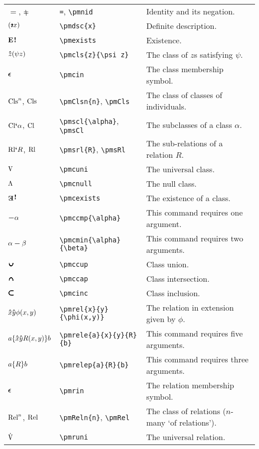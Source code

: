 \documentclass[12pt]{article}
\begin{document}
\noindent \begin{tabular}{@{}p{3cm} | p{5cm} | p{8.25cm}}
	$=$, $\pmnid$ & \verb|=|, \verb|\pmnid| & Identity and its negation. \\
	$\pmdsc{x}$ & \verb|\pmdsc{x}| & Definite description. \\
	$\textbf{E}\hspace{.1em}\textbf{!}$ & \verb|\pmexists| & Existence. \\
	$\mathbf{\hat{\text{$z$}}}(\psi z)$ & \verb|\pmcls{z}{\psi z}| & The class of $z$s satisfying $\psi$. \\
	$\mathop{\boldsymbol{\epsilon}}$ & \verb|\pmcin| & The class membership symbol. \\
	$\text{Cls}^{n}$, $\text{Cls}$ &  \verb|\pmClsn{n}|, \verb|\pmCls| & The class of classes of individuals. \\
	 $\text{Cl}\textbf{`}\alpha$, $\text{Cl}$ & \verb|\pmscl{\alpha}|, \verb|\pmsCl| & The subclasses of a class $\alpha$. \\
	 $\text{Rl}\textbf{`}R$, $\text{Rl}$ & \verb|\pmsrl{R}|, \verb|\pmsRl| & The sub-relations of a relation $R$. \\
	$\pmcuni$ & \verb|\pmcuni| & The universal class. \\
	$\Lambda$ & \verb|\pmcnull| & The null class. \\
	$\pmcexists$ & \verb|\pmcexists| & The existence of a class. \\
	$\boldsymbol{-}\alpha$ & \verb|\pmccmp{\alpha}| & This command requires one argument. \\
	$\alpha\boldsymbol{-}\beta$ & \verb|\pmcmin{\alpha}{\beta}| & This command requires two arguments. \\
	$\pmccup$ & \verb|\pmccup| & Class union. \\
	$\pmccap$ & \verb|\pmccap| & Class intersection. \\
	$\pmcinc$ & \verb|\pmcinc| & Class inclusion. \\
	$\mathbf{\hat{\text{$x$}}}\mathbf{\hat{\text{$y$}}}\phi(x,y)$ & \verb|\pmrel{x}{y}{\phi(x,y)}| & The relation in extension given by $\phi$. \\
	$a\{\mathbf{\hat{\text{$x$}}}\mathbf{\hat{\text{$y$}}}R(x, y)\}b$ & \verb|\pmrele{a}{x}{y}{R}{b}| & This command requires five arguments. \\
	$a\{R\}b$ & \verb|\pmrelep{a}{R}{b}| & This command requires three arguments. \\
	$\mathop{\boldsymbol{\epsilon}}$ & \verb|\pmrin| & The relation membership symbol. \\
	$\text{Rel}^{n}$, $\text{Rel}$ & \verb|\pmReln{n}|, \verb|\pmRel| & The class of relations ($n$-many `of relations'). \\
	$\pmruni$ & \verb|\pmruni| & The universal relation. \\

\end{tabular}
\end{document}

